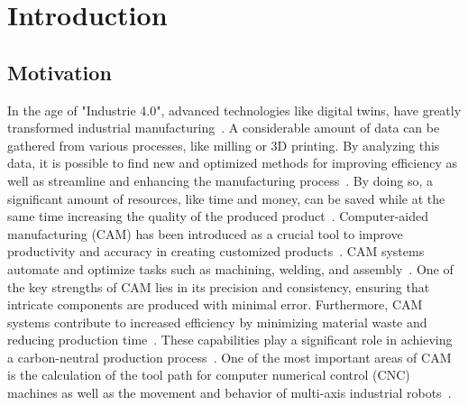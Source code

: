 \chapter{Introduction}%
\section{Motivation}%

In the age of "Industrie 4.0", advanced technologies like digital twins, have greatly transformed industrial manufacturing~\cite{Singh.2021}. A considerable amount of data can be gathered from various processes, like milling or 3D printing. By analyzing this data, it is possible to find new and optimized methods for improving efficiency as well as streamline and enhancing the manufacturing process~\cite{Ghobakhloo.2020}. By doing so, a significant amount of resources, like time and money, can be saved while at the same time increasing the quality of the produced product~\cite{Bibby.2018,Simonis.2016}.
Computer-aided manufacturing (\acrshort{CAM}) has been introduced as a crucial tool to improve productivity and accuracy in creating customized products~\cite{Feldhausen.2022}. \acrshort{CAM} systems automate and optimize tasks such as machining, welding, and assembly~\cite{LalitNarayan.2013b}. One of the key strengths of \acrshort{CAM} lies in its precision and consistency, ensuring that intricate components are produced with minimal error. Furthermore, \acrshort{CAM} systems contribute to increased efficiency by minimizing material waste and reducing production time~\cite{Dubovska.2014}. These capabilities play a significant role in achieving a carbon-neutral production process~\cite{Saxena.2020}. One of the most important areas of \acrshort{CAM} is the calculation of the tool path for computer numerical control (\acrshort{CNC}) machines as well as the movement and behavior of multi-axis industrial robots~\cite{Pan}. 


